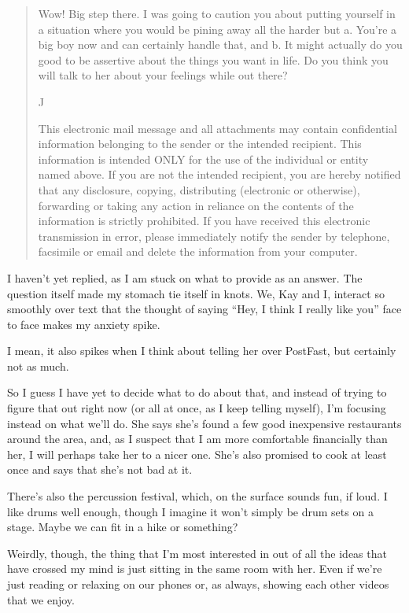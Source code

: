 \begin{quote}
Wow! Big step there. I was going to caution you about putting yourself in a situation where you would be pining away all the harder but a. You're a big boy now and can certainly handle that, and b. It might actually do you good to be assertive about the things you want in life. Do you think you will talk to her about your feelings while out there?

J

This electronic mail message and all attachments may contain confidential information belonging to the sender or the intended recipient. This information is intended ONLY for the use of the individual or entity named above. If you are not the intended recipient, you are hereby notified that any disclosure, copying, distributing (electronic or otherwise), forwarding or taking any action in reliance on the contents of the information is strictly prohibited. If you have received this electronic transmission in error, please immediately notify the sender by telephone, facsimile or email and delete the information from your computer.
\end{quote}

I haven't yet replied, as I am stuck on what to provide as an answer. The question itself made my stomach tie itself in knots. We, Kay and I, interact so smoothly over text that the thought of saying ``Hey, I think I really like you'' face to face makes my anxiety spike.

I mean, it also spikes when I think about telling her over PostFast, but certainly not as much.

So I guess I have yet to decide what to do about that, and instead of trying to figure that out right now (or all at once, as I keep telling myself), I'm focusing instead on what we'll do. She says she's found a few good inexpensive restaurants around the area, and, as I suspect that I am more comfortable financially than her, I will perhaps take her to a nicer one. She's also promised to cook at least once and says that she's not bad at it.

There's also the percussion festival, which, on the surface sounds fun, if loud. I like drums well enough, though I imagine it won't simply be drum sets on a stage. Maybe we can fit in a hike or something?

Weirdly, though, the thing that I'm most interested in out of all the ideas that have crossed my mind is just sitting in the same room with her. Even if we're just reading or relaxing on our phones or, as always, showing each other videos that we enjoy.

